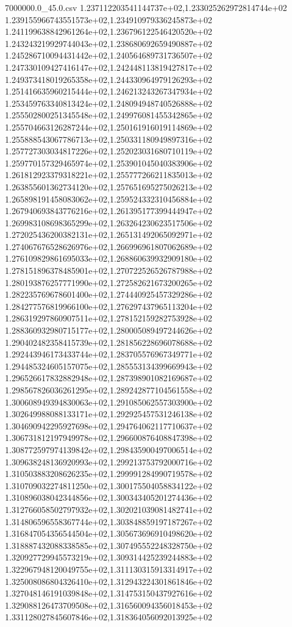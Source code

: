 \begin{filecontents*}{7000000.0_45.0.csv}
1.237112203541144737e+02,1.233025262972814744e+02
1.239155966743551573e+02,1.234910979336245873e+02
1.241199638842961264e+02,1.236796122546420520e+02
1.243243219929744043e+02,1.238680692659490887e+02
1.245286710094431442e+02,1.240564689731736507e+02
1.247330109427416147e+02,1.242448113819427817e+02
1.249373418019265358e+02,1.244330964979126293e+02
1.251416635960215444e+02,1.246213243267347934e+02
1.253459763340813424e+02,1.248094948740526888e+02
1.255502800251345548e+02,1.249976081455342865e+02
1.255704663126287244e+02,1.250161916019114869e+02
1.255888543067786713e+02,1.250331180949897316e+02
1.257727303034817226e+02,1.252023031680710119e+02
1.259770157329465974e+02,1.253901045040383906e+02
1.261812923379318221e+02,1.255777266211835013e+02
1.263855601362734120e+02,1.257651695275026213e+02
1.265898191458083062e+02,1.259524332310456884e+02
1.267940693843776216e+02,1.261395177399444947e+02
1.269983108698365299e+02,1.263264230623517506e+02
1.272025436200382131e+02,1.265131492065092971e+02
1.274067676528626976e+02,1.266996961807062689e+02
1.276109829861695033e+02,1.268860639932909180e+02
1.278151896378485901e+02,1.270722526526787988e+02
1.280193876257771990e+02,1.272582621673200265e+02
1.282235769678601400e+02,1.274440925457329286e+02
1.284277576819966100e+02,1.276297437965113204e+02
1.286319297860907511e+02,1.278152159282753928e+02
1.288360932980715177e+02,1.280005089497244626e+02
1.290402482358415739e+02,1.281856228696078688e+02
1.292443946173433744e+02,1.283705576967349771e+02
1.294485324605157075e+02,1.285553134399669943e+02
1.296526617832882948e+02,1.287398901082169687e+02
1.298567826036261295e+02,1.289242877104561558e+02
1.300608949394830063e+02,1.291085062557303900e+02
1.302649988088133171e+02,1.292925457531246138e+02
1.304690942295927698e+02,1.294764062117710637e+02
1.306731812197949978e+02,1.296600876408847398e+02
1.308772597974139842e+02,1.298435900497006514e+02
1.309638248136920993e+02,1.299213753792000716e+02
1.310503883208626235e+02,1.299991284990719578e+02
1.310709032274811250e+02,1.300175504058834122e+02
1.310896038042344856e+02,1.300343405201274436e+02
1.312766058502797932e+02,1.302021039081482741e+02
1.314806596558367744e+02,1.303848859197187267e+02
1.316847054356544504e+02,1.305673696910498620e+02
1.318887432088338585e+02,1.307495552248328750e+02
1.320927729945573219e+02,1.309314425239244883e+02
1.322967948120049755e+02,1.311130315913314917e+02
1.325008086804326410e+02,1.312943224301861846e+02
1.327048146191039848e+02,1.314753150437927616e+02
1.329088126473709508e+02,1.316560094356018453e+02
1.331128027845607846e+02,1.318364056092013925e+02

\end{filecontents*}
